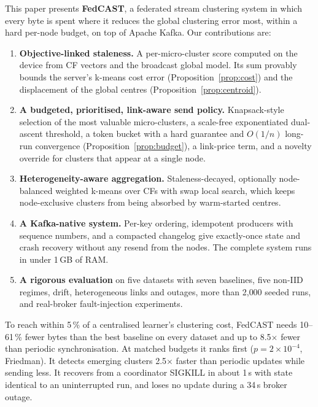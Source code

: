 This paper presents \textbf{FedCAST}, a federated stream clustering system in which every byte is spent where it reduces the global clustering error most, within a hard per-node budget, on top of Apache Kafka. Our contributions are:
\begin{enumerate}
\item \textbf{Objective-linked staleness.} A per-micro-cluster score computed on the device from CF vectors and the broadcast global model. Its sum provably bounds the server's k-means cost error (Proposition~\ref{prop:cost}) and the displacement of the global centres (Proposition~\ref{prop:centroid}).
\item \textbf{A budgeted, prioritised, link-aware send policy.} Knapsack-style selection of the most valuable micro-clusters, a scale-free exponentiated dual-ascent threshold, a token bucket with a hard guarantee and $O(1/n)$ long-run convergence (Proposition~\ref{prop:budget}), a link-price term, and a novelty override for clusters that appear at a single node.
\item \textbf{Heterogeneity-aware aggregation.} Staleness-decayed, optionally node-balanced weighted k-means over CFs with swap local search, which keeps node-exclusive clusters from being absorbed by warm-started centres.
\item \textbf{A Kafka-native system.} Per-key ordering, idempotent producers with sequence numbers, and a compacted changelog give exactly-once state and crash recovery without any resend from the nodes. The complete system runs in under 1\,GB of RAM.
\item \textbf{A rigorous evaluation} on five datasets with seven baselines, five non-IID regimes, drift, heterogeneous links and outages, more than 2{,}000 seeded runs, and real-broker fault-injection experiments.
\end{enumerate}

To reach within 5\,\% of a centralised learner's clustering cost, FedCAST needs 10--61\,\% fewer bytes than the best baseline on every dataset and up to 8.5$\times$ fewer than periodic synchronisation. At matched budgets it ranks first ($p{=}2{\times}10^{-4}$, Friedman). It detects emerging clusters 2.5$\times$ faster than periodic updates while sending less. It recovers from a coordinator SIGKILL in about 1\,s with state identical to an uninterrupted run, and loses no update during a 34\,s broker outage.
